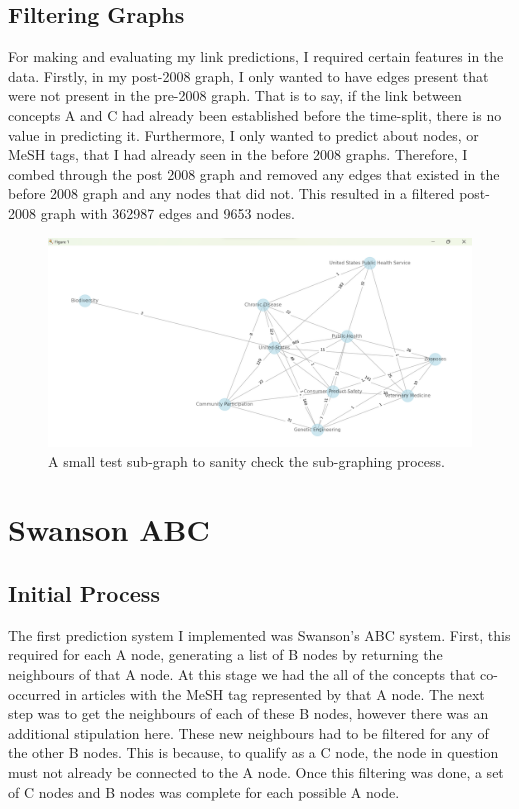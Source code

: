\documentclass{l4proj}
\begin{document}
\subsection{Filtering Graphs}

For making and evaluating my link predictions, I required certain features in the data. Firstly, in my post-2008 graph, I only wanted to have edges present that were not present in the pre-2008 graph. That is to say, if the link between concepts A and C had already been established before the time-split, there is no value in predicting it. Furthermore, I only wanted to predict about nodes, or MeSH tags, that I had already seen in the before 2008 graphs. Therefore, I combed through the post 2008 graph and removed any edges that existed in the before 2008 graph and any nodes that did not. This resulted in a filtered post-2008 graph with 362987 edges and 9653 nodes. \\

\begin{figure}[h]
    \centering
    \includegraphics[width=\linewidth]{images/test_subgraph.png}
    \caption{A small test sub-graph to sanity check the sub-graphing process.}
    \label{fig:test_subgraph}
\end{figure}

\section{Swanson ABC}

\subsection{Initial Process}

The first prediction system I implemented was Swanson's ABC system. First, this required for each A node, generating a list of B nodes by returning the neighbours of that A node. At this stage we had the all of the concepts that co-occurred in articles with the MeSH tag represented by that A node. The next step was to get the neighbours of each of these B nodes, however there was an additional stipulation here. These new neighbours had to be filtered for any of the other B nodes. This is because, to qualify as a C node, the node in question must not already be connected to the A node. Once this filtering was done, a set of C nodes and B nodes was complete for each possible A node. \\
\end{document}
